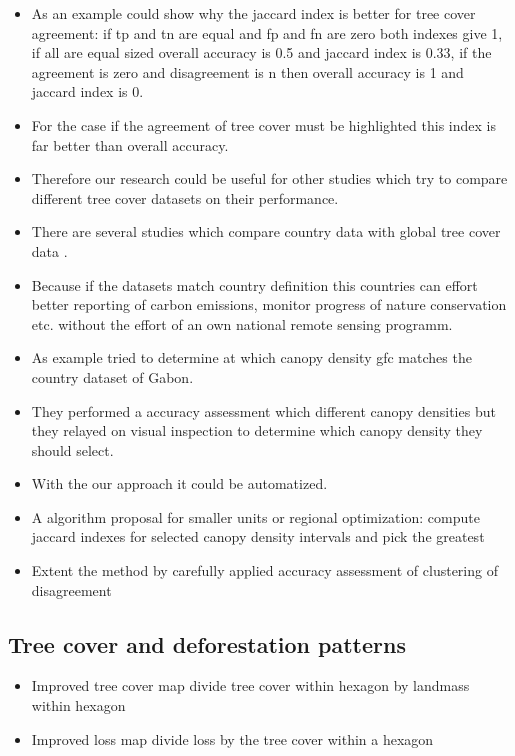 \begin{itemize}
				\item As an example could show why the jaccard index is better for tree cover agreement: if tp and tn are equal and fp and fn are zero both indexes give 1, if all are equal sized overall accuracy is 0.5 and jaccard index is 0.33, if the agreement is zero and disagreement is n then overall accuracy is 1 and jaccard index is 0.
				\item For the case if the agreement of tree cover must be highlighted this index is far better than overall accuracy.
				\item Therefore our research could be useful for other studies which try to compare different tree cover datasets on their performance.
				\item There are several studies which compare country data with global tree cover data \citep{Sannier2016,McRoberts2016,Gross2017}.
				\item Because if the datasets match country definition this countries can effort better reporting of carbon emissions, monitor progress of nature conservation etc. without the effort of an own national remote sensing programm.
				\item As example \citep{Sannier2016} tried to determine at which canopy density gfc matches the country dataset of Gabon.
				\item They performed a accuracy assessment which different canopy densities but they relayed on visual inspection to determine which canopy density they should select.
				\item With the our approach it could be automatized.
				\item A algorithm proposal for smaller units or regional optimization: compute jaccard indexes for selected canopy density intervals and pick the greatest
				\item Extent the method by carefully applied accuracy assessment of clustering of disagreement 
			\end{itemize}

		\subsection{Tree cover and deforestation patterns}
		\label{subsec:discussion_tree_cover_and_deforestation}
			\begin{itemize}
				\item Improved tree cover map divide tree cover within hexagon by landmass within hexagon
				\item Improved loss map divide loss by the tree cover within a hexagon
			\end{itemize}

